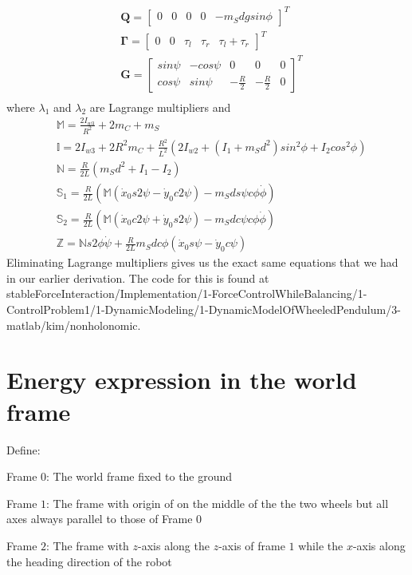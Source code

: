 \documentclass[a4paper,10pt]{article}
\begin{document}
\begin{align}
  &\mathbf{Q} = [\begin{matrix} 0 & 0 & 0 & 0 & -m_Sdgsin\phi \end{matrix}]^T \nonumber \\
  &\mathbf{\Gamma} = [\begin{matrix} 0 & 0 & \tau_l & \tau_r & \tau_l+\tau_r \end{matrix}]^T \nonumber \\
  &\mathbf{G} = \left[\begin{matrix} sin\psi & -cos\psi & 0 & 0 & 0 \\ cos\psi & sin\psi & -\frac{R}{2} & -\frac{R}{2} & 0 \end{matrix}\right]^T \nonumber \\
\end{align}
where $\lambda_1$ and $\lambda_2$ are Lagrange multipliers and 
\begin{align}
 &\mathbb{M} = \frac{2I_{w3}}{R^2}+2m_C+m_S \nonumber \\
 &\mathbb{I} = 2I_{w3}+2R^2m_C+\frac{R^2}{L^2}\left(2I_{w2}+(I_1+m_Sd^2)sin^2\phi+I_2cos^2\phi\right) \nonumber \\
 &\mathbb{N} = \frac{R}{2L}(m_Sd^2 + I_1 - I_2) \nonumber \\
 &\mathbb{S}_1 = \frac{R}{2L}(\mathbb{M}(\dot{x}_0 s2\psi-\dot{y}_0 c2\psi)-m_Sds\psi c\phi\dot\phi) \nonumber \\
 &\mathbb{S}_2 = \frac{R}{2L}(\mathbb{M}(\dot{x}_0 c2\psi+\dot{y}_0 s2\psi)-m_Sdc\psi c\phi\dot\phi) \nonumber \\
 &\mathbb{Z} = \mathbb{N}s2\phi\dot\psi + \frac{R}{2L}m_Sdc\phi(\dot{x}_0s\psi-\dot{y}_0c\psi)  \nonumber
\end{align}
Eliminating Lagrange multipliers gives us the exact same equations that we had in our earlier derivation.
The code for this is found at stableForceInteraction/Implementation/1-ForceControlWhileBalancing/1-ControlProblem1/1-DynamicModeling/1-DynamicModelOfWheeledPendulum/3-matlab/kim/nonholonomic.

\section{Energy expression in the world frame}
Define:

Frame $0$: The world frame fixed to the ground

Frame $1$: The frame with origin of on the middle of the the two wheels but all axes always parallel to those of Frame $0$

Frame $2$: The frame with $z$-axis along the $z$-axis of frame $1$ while the $x$-axis along the heading direction of the robot
\end{document}
